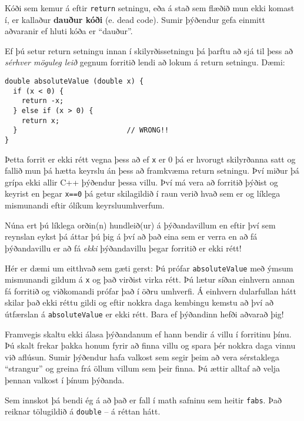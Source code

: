 Kóði sem kemur á eftir {\tt return} setningu, eða á stað sem flæðið mun ekki komast í, er kallaður {\bf dauður kóði} (e. dead code).
Sumir þýðendur gefa einmitt aðvaranir ef hluti kóða er ``dauður''.


Ef þú setur return setningu innan í skilyrðissetningu þá þarftu að sjá til þess að {\em sérhver möguleg leið} gegnum forritið lendi að lokum á return setningu.
Dæmi: 

\begin{verbatim}
double absoluteValue (double x) {
  if (x < 0) {
    return -x;
  } else if (x > 0) {
    return x;
  }                          // WRONG!!
}
\end{verbatim}
%
Þetta forrit er ekki rétt vegna þess að ef {\tt x} er 0 þá er hvorugt skilyrðanna satt og fallið mun þá hætta keyrslu án þess að framkvæma return setningu.
Því miður þá grípa ekki allir C++ þýðendur þessa villu.
Því má vera að forritið þýðist og keyrist en þegar {\tt x==0} þá getur skilagildið í raun verið hvað sem er og líklega mismunandi eftir ólíkum keyrsluumhverfum.


Núna ert þú líklega orðin(n) hundleið(ur) á þýðandavillum en eftir því sem reynslan eykst þá áttar þú þig á því 
að það eina sem er verra en að fá þýðandavillu er að fá {\em ekki} þýðandavillu þegar forritið er ekki rétt!

Hér er dæmi um eitthvað sem gæti gerst: Þú prófar {\tt absoluteValue} með ýmsum mismunandi gildum á {\tt x} og það virðist virka rétt.
Þú lætur síðan einhvern annan fá forritið og viðkomandi prófar það í öðru umhverfi.
Á einhvern dularfullan hátt skilar það ekki réttu gildi og eftir nokkra daga kembingu kemstu að því að útfærslan á {\tt absoluteValue} er ekki rétt.
Bara ef þýðandinn hefði aðvarað þig!


Framvegis skaltu ekki álasa þýðandanum ef hann bendir á villu í forritinu þínu.
Þú skalt frekar þakka honum fyrir að finna villu og spara þér nokkra daga vinnu við aflúsun.
Sumir þýðendur hafa valkost sem segir þeim að vera sérstaklega ``strangur'' og greina frá öllum villum sem þeir finna.
Þú ættir alltaf að velja þennan valkost í þínum þýðanda.


Sem innskot þá bendi ég á að það er fall í math safninu sem heitir {\tt fabs}.
Það reiknar tölugildið á {\tt double} -- á réttan hátt.

